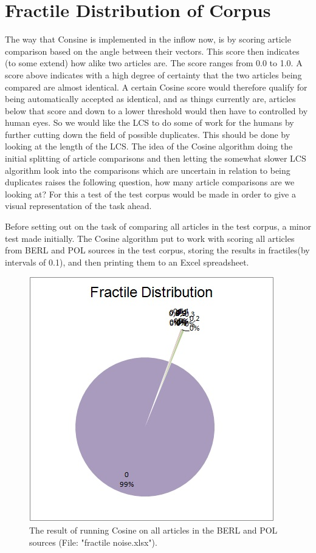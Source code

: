 \section{Fractile Distribution of Corpus}
The way that Consine is implemented in the inflow now, is by scoring article comparison based on the angle between their vectors. This score then indicates (to some extend) how alike two articles are. The score ranges from 0.0 to 1.0. A score above indicates with a high degree of certainty that the two articles being compared are almost identical. A certain Cosine score would therefore qualify for being automatically accepted as identical, and as things currently are, articles below that score and down to a lower threshold would then have to controlled by human eyes. So we would like the LCS to do some of work for the humans by further cutting down the field of possible duplicates. This should be done by looking at the length of the LCS. The idea of the Cosine algorithm doing the initial splitting of article comparisons and then letting the somewhat slower LCS algorithm look into the comparisons which are uncertain in relation to being duplicates raises the following question, how many article comparisons are we looking at? For this a test of the test corpus would be made in order to give a visual representation of the task ahead.

Before setting out on the task of comparing all articles in the test corpus, a minor test made initially. The Cosine algorithm put to work with scoring all articles from BERL and POL sources in the test corpus, storing the results in fractiles(by intervals of 0.1), and then printing them to an Excel spreadsheet.

\begin{figure}
	\centering
	\includegraphics[scale=1.0]{figures/FractileNoise}
	\caption{The result of running Cosine on all articles in the BERL and POL sources (File: "fractile noise.xlsx").}
	\label{FractileNoise}
\end{figure}

